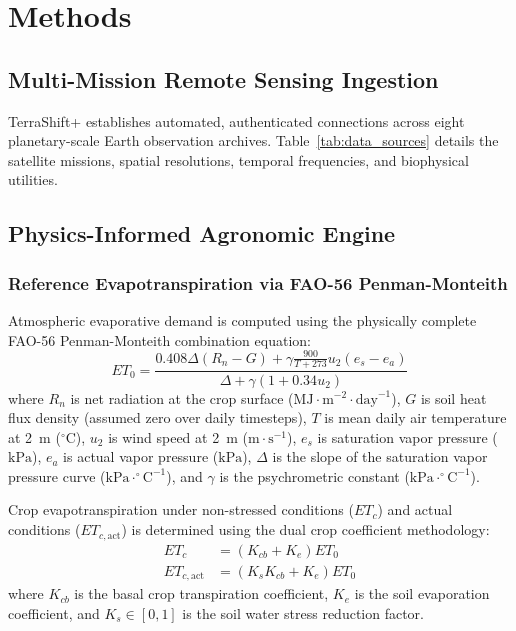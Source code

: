 \documentclass[10pt,twocolumn]{article}
\begin{document}
\section{Methods}

\subsection{Multi-Mission Remote Sensing Ingestion}
TerraShift+ establishes automated, authenticated connections across eight planetary-scale Earth observation archives. Table~\ref{tab:data_sources} details the satellite missions, spatial resolutions, temporal frequencies, and biophysical utilities.

\subsection{Physics-Informed Agronomic Engine}

\subsubsection{Reference Evapotranspiration via FAO-56 Penman-Monteith}
Atmospheric evaporative demand is computed using the physically complete FAO-56 Penman-Monteith combination equation:
\begin{equation}
ET_0 = \frac{0.408 \Delta (R_n - G) + \gamma \frac{900}{T + 273} u_2 (e_s - e_a)}{\Delta + \gamma (1 + 0.34 u_2)}
\end{equation}
where $R_n$ is net radiation at the crop surface ($\text{MJ}\cdot\text{m}^{-2}\cdot\text{day}^{-1}$), $G$ is soil heat flux density (assumed zero over daily timesteps), $T$ is mean daily air temperature at 2~m ($^\circ\text{C}$), $u_2$ is wind speed at 2~m ($\text{m}\cdot\text{s}^{-1}$), $e_s$ is saturation vapor pressure ($\text{kPa}$), $e_a$ is actual vapor pressure ($\text{kPa}$), $\Delta$ is the slope of the saturation vapor pressure curve ($\text{kPa}\cdot^\circ\text{C}^{-1}$), and $\gamma$ is the psychrometric constant ($\text{kPa}\cdot^\circ\text{C}^{-1}$).

Crop evapotranspiration under non-stressed conditions ($ET_c$) and actual conditions ($ET_{c,\text{act}}$) is determined using the dual crop coefficient methodology:
\begin{align}
ET_c &= (K_{cb} + K_e) ET_0 \\
ET_{c,\text{act}} &= (K_s K_{cb} + K_e) ET_0
\end{align}
where $K_{cb}$ is the basal crop transpiration coefficient, $K_e$ is the soil evaporation coefficient, and $K_s \in [0, 1]$ is the soil water stress reduction factor.
\end{document}
